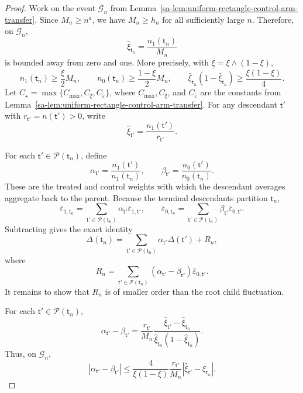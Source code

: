 \documentclass[10pt]{article}
\def\nodet{\mathsf{t}}
\theoremstyle{definition}
\theoremstyle{remark}
\begin{document}
\begin{proof}
Work on the event $\mathcal G_n$ from Lemma~\ref{sa-lem:uniform-rectangle-control-arm-transfer}. Since $M_n\geq n^a$, we have $M_n\geq h_n$ for all sufficiently large $n$. Therefore, on $\mathcal G_n$,
\[
    \hat\xi_{\nodet_n}
    =
    \frac{n_1(\nodet_n)}{M_n}
\]
is bounded away from zero and one. More precisely, with $\underline\xi=\xi\wedge(1-\xi)$,
\[
    n_1(\nodet_n)\geq \frac{\xi}{2}M_n,
    \qquad
    n_0(\nodet_n)\geq \frac{1-\xi}{2}M_n,
    \qquad
    \hat\xi_{\nodet_n}(1-\hat\xi_{\nodet_n})
    \geq
    \frac{\xi(1-\xi)}{4}.
\]
Let $C_\star=\max\{C_{\max},C_{\xi},C_{\bar\varepsilon}\}$, where
$C_{\max},C_{\xi}$, and $C_{\bar\varepsilon}$ are the constants from
Lemma~\ref{sa-lem:uniform-rectangle-control-arm-transfer}.
For any descendant $\nodet'$ with
$r_{\nodet'}=n(\nodet')>0$, write
\[
    \hat\xi_{\nodet'}
    =
    \frac{n_1(\nodet')}{r_{\nodet'}}.
\]

For each $\nodet'\in\mathcal P(\nodet_n)$, define
\[
    \alpha_{\nodet'}
    =
    \frac{n_1(\nodet')}{n_1(\nodet_n)},
    \qquad
    \beta_{\nodet'}
    =
    \frac{n_0(\nodet')}{n_0(\nodet_n)}.
\]
These are the treated and control weights with which the descendant averages
aggregate back to the parent. Because the terminal descendants partition
$\nodet_n$,
\[
    \bar\varepsilon_{1,\nodet_n}
    =
    \sum_{\nodet'\in\mathcal P(\nodet_n)}
    \alpha_{\nodet'}\bar\varepsilon_{1,\nodet'},
    \qquad
    \bar\varepsilon_{0,\nodet_n}
    =
    \sum_{\nodet'\in\mathcal P(\nodet_n)}
    \beta_{\nodet'}\bar\varepsilon_{0,\nodet'}.
\]
Subtracting gives the exact identity
\[
    \Delta(\nodet_n)
    =
    \sum_{\nodet'\in\mathcal P(\nodet_n)}
    \alpha_{\nodet'}\Delta(\nodet')
    +
    R_n,
\]
where
\[
    R_n
    =
    \sum_{\nodet'\in\mathcal P(\nodet_n)}
    (\alpha_{\nodet'}-\beta_{\nodet'})
    \bar\varepsilon_{0,\nodet'}.
\]
It remains to show that $R_n$ is of smaller order than the root child fluctuation.

For each $\nodet'\in\mathcal P(\nodet_n)$,
\[
    \alpha_{\nodet'}-\beta_{\nodet'}
    =
    \frac{r_{\nodet'}}{M_n}
    \frac{\hat\xi_{\nodet'}-\hat\xi_{\nodet_n}}
         {\hat\xi_{\nodet_n}(1-\hat\xi_{\nodet_n})}.
\]
Thus, on $\mathcal G_n$,
\[
    |\alpha_{\nodet'}-\beta_{\nodet'}|
    \leq
    \frac{4}{\xi(1-\xi)}
    \frac{r_{\nodet'}}{M_n}
    |\hat\xi_{\nodet'}-\hat\xi_{\nodet_n}|.
\]


\end{proof}
\end{document}
